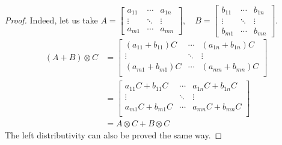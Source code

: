 \documentclass[11pt]{article}
\newcommand{\kp}{\otimes} %
\begin{document}
\begin{proof}
Indeed, let us take $A = \begin{bmatrix}a_{11} & \cdots & a_{1n} \\
\vdots & \ddots & \vdots \\
a_{m1} & \cdots & a_{mn}
\end{bmatrix}, \quad B = \begin{bmatrix}b_{11} & \cdots & b_{1n} \\
\vdots & \ddots & \vdots \\
b_{m1} & \cdots & b_{mn}
\end{bmatrix}$.
\begin{align*}
(A+B)\kp C &= \begin{bmatrix}
(a_{11}+b_{11} )C &\cdots& (a_{1n}+b_{1n})C\\
\vdots & \ddots & \vdots\\
(a_{m1}+b_{m1}) C &\cdots & (a_{mn}+b_{mn})C\\
\end{bmatrix}\\
&= \begin{bmatrix}
a_{11}C+b_{11}C &\cdots& a_{1n}C+b_{1n}C\\
\vdots & \ddots & \vdots\\
a_{m1}C+b_{m1} C &\cdots & a_{mn}C+b_{mn}C\\
\end{bmatrix}\\
&= A\kp C + B\kp C
\end{align*}
The left distributivity can also be proved the same way.

\begin{comment}
I wrote a simpler proof but if you want to keep this one, uncomment it :) 
\begin{align*}
    e^{A\kp I}e^{I\kp B}&=\sum_{k=0}^{\infty}\frac{1}{k!}(A\kp I)^k \sum_{j=0}^{\infty}\frac{1}{j!}(I\kp B)^j\\
    &=\sum_{k=0}^{\infty}\sum_{j=0}^{\infty}\frac{1}{k!}\,\frac{1}{j!}(A\kp I)^k (I\kp B)^j\\
    &=\sum_{k=0}^{\infty}\sum_{j=0}^{\infty}\frac{(k+j)!}{(k+j)!}\,\frac{1}{k!}\,\frac{1}{j!}(A\kp I)^k (I\kp B)^j\\
    &=\sum_{k=0}^{\infty}\sum_{j=0}^{\infty}\frac{1}{(k+j)!}\binom{k+j}{j}(A\kp I)^k (I\kp B)^j.
\end{align*}
Let $m=k+j$; we can then write this as
\begin{align*}
    &=\sum_{m=0}^{\infty} \sum_{j = 0}^m\frac{1}{m!}\binom{m}{j}(A\kp I)^{m-j} (I\kp B)^j\\
    &=\sum_{m=0}^{\infty}\frac{1}{m!}(A\kp I+I\kp B)^m\\
    &=e^{A\kp I+I\kp B},
\end{align*}
where the second equality comes from the binomial formula, which we can use because of the commutativity we observed earlier.
Note that the bounds on the sum indexed by \(j\) have changed; this is because of the change of variables and is consistent with the definition of \(m \geqslant j\).

\end{comment}
\end{proof}
\end{document}
